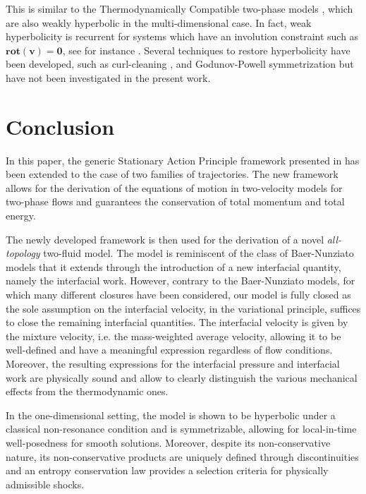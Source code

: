 \documentclass{myclass}
\newcommand{\rot}{\mathbf{rot}}
\begin{document}
This is similar to the Thermodynamically Compatible two-phase models \cite{romenski:2007,romenski:2010}, which are also weakly hyperbolic in the multi-dimensional case. In fact, weak hyperbolicity is recurrent for systems which have an involution constraint such as $\rot(\bm{v})=\bm{0}$, see for instance \cite{romenski:2010,dhaouadi:2024}. Several techniques to restore hyperbolicity have been developed, such as curl-cleaning \cite{dumbser:2020}, and Godunov-Powell symmetrization \cite{godunov:2025b,powell:1999} but have not been investigated in the present work.

\section{Conclusion}\label{sec:Conclusions}
In this paper, the generic Stationary Action Principle framework presented in \cite{haegeman_GenSAP:2025} has been extended to the case of two families of trajectories. The new framework allows for the derivation of the equations of motion in two-velocity models for two-phase flows and guarantees the conservation of total momentum and total energy. 

The newly developed framework is then used for the derivation of a novel \textit{all-topology} two-fluid model. The model is reminiscent of the class of Baer-Nunziato models that it extends through the introduction of a new interfacial quantity, namely the interfacial work. However, contrary to the Baer-Nunziato models, for which many different closures have been considered, our model is fully closed as the sole assumption on the interfacial velocity, in the variational principle, suffices to close the remaining interfacial quantities. The interfacial velocity is given by the mixture velocity, i.e. the mass-weighted average velocity, allowing it to be well-defined and have a meaningful expression regardless of flow conditions. Moreover, the resulting expressions for the interfacial pressure and interfacial work are physically sound and allow to clearly distinguish the various mechanical effects from the thermodynamic ones. 

In the one-dimensional setting, the model is shown to be hyperbolic under a classical non-resonance condition and is symmetrizable, allowing for local-in-time well-posedness for smooth solutions. Moreover, despite its non-conservative nature, its non-conservative products are uniquely defined through discontinuities and an entropy conservation law provides a selection criteria for physically admissible shocks. 
\end{document}

